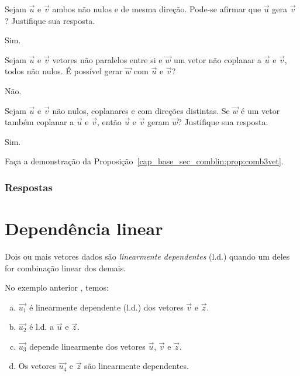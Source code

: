 \begin{exer}
  Sejam $\vec{u}$ e $\vec{v}$ ambos não nulos e de mesma direção. Pode-se afirmar que $\vec{u}$ gera $\vec{v}$? Justifique sua resposta.
\end{exer}
\begin{resp}
  Sim.
\end{resp}

\begin{exer}
  Sejam $\vec{u}$ e $\vec{v}$ vetores não paralelos entre si e $\vec{w}$ um vetor não coplanar a $\vec{u}$ e $\vec{v}$, todos não nulos. É possível gerar $\vec{w}$ com $\vec{u}$ e $\vec{v}$?
\end{exer}
\begin{resp}
  Não.
\end{resp}

\begin{exer}
  Sejam $\vec{u}$ e $\vec{v}$ não nulos, coplanares e com direções distintas. Se $\vec{w}$ é um vetor também coplanar a $\vec{u}$ e $\vec{v}$, então $\vec{u}$ e $\vec{v}$ geram $\vec{w}$? Justifique sua resposta.
\end{exer}
\begin{resp}
  Sim.
\end{resp}

\begin{exer}\label{cap_base_sec_comblin:exer:comb3vet}
  Faça a demonstração da Proposição~\ref{cap_base_sec_comblin:prop:comb3vet}.
\end{exer}

\ifisbook
\subsubsection{Respostas}
\shipoutAnswer
\fi


\section{Dependência linear}\label{cap_base_sec_deplinear}
\badgeRevisar

Dois ou mais vetores dados são \emph{linearmente dependentes} (l.d.) quando um deles for combinação linear dos demais.

\begin{ex}\label{ex:deplinear}
  No exemplo anterior , temos:
  \begin{enumerate}[a)]
  \item $\vec{u_1}$ é linearmente dependente (l.d.) dos vetores $\vec{v}$ e $\vec{z}$.
  \item $\vec{u_2}$ é l.d. a $\vec{u}$ e $\vec{z}$.
  \item $\vec{u_3}$ depende linearmente dos vetores $\vec{u}$, $\vec{v}$ e $\vec{z}$.
  \item Os vetores $\vec{u_4}$ e $\vec{z}$ são linearmente dependentes.
  \end{enumerate}
\end{ex}

